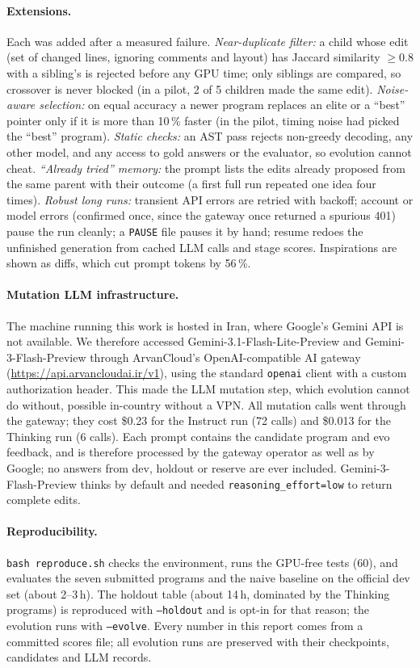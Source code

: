 \documentclass{article}
\begin{document}
\paragraph{Extensions.} Each was added after a measured failure. \emph{Near-duplicate filter:} a child whose edit
(set of changed lines, ignoring comments and layout) has Jaccard similarity $\geq0.8$ with a sibling's is rejected
before any GPU time; only siblings are compared, so crossover is never blocked (in a pilot, 2 of 5 children made the
same edit). \emph{Noise-aware selection:} on equal accuracy a newer program replaces an elite or a ``best'' pointer
only if it is more than 10\,\% faster (in the pilot, timing noise had picked the ``best'' program). \emph{Static
checks:} an AST pass rejects non-greedy decoding, any other model, and any access to gold answers or the evaluator,
so evolution cannot cheat. \emph{``Already tried'' memory:} the prompt lists the edits already proposed from the
same parent with their outcome (a first full run repeated one idea four times). \emph{Robust long runs:} transient
API errors are retried with backoff; account or model errors (confirmed once, since the gateway once returned a
spurious 401) pause the run cleanly; a \texttt{PAUSE} file pauses it by hand; resume redoes the unfinished
generation from cached LLM calls and stage scores. Inspirations are shown as diffs, which cut prompt tokens by 56\,\%.

\paragraph{Mutation LLM infrastructure.} The machine running this work is hosted in Iran, where Google's Gemini API
is not available. We therefore accessed Gemini-3.1-Flash-Lite-Preview and Gemini-3-Flash-Preview through ArvanCloud's
OpenAI-compatible AI gateway (\url{https://api.arvancloudai.ir/v1}), using the standard \texttt{openai} client with a
custom authorization header. This made the LLM mutation step, which evolution cannot do without, possible in-country
without a VPN. All mutation calls went through the gateway; they cost \$0.23 for the Instruct run (72 calls) and
\$0.013 for the Thinking run (6 calls). Each prompt contains the candidate program and evo feedback, and is therefore
processed by the gateway operator as well as by Google; no answers from dev, holdout or reserve are ever included.
Gemini-3-Flash-Preview thinks by default and needed \texttt{reasoning\_effort=low} to return complete edits.

\paragraph{Reproducibility.} \texttt{bash reproduce.sh} checks the environment, runs the GPU-free tests (60),
and evaluates the seven submitted programs and the naive baseline on the official dev set (about 2--3\,h). The
holdout table (about 14\,h, dominated by the Thinking programs) is reproduced with \texttt{--holdout} and is opt-in
for that reason; the evolution runs with \texttt{--evolve}. Every number in this report comes from a committed scores
file; all evolution runs are preserved with their checkpoints, candidates and LLM records.
\end{document}
